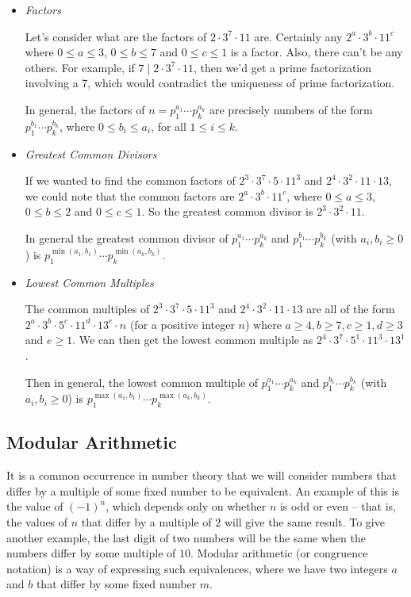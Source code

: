 \documentclass[a4paper]{scrartcl}
\begin{document}
\begin{itemize}
	\item \emph{Factors}
	
	Let's consider what are the factors of $2 \cdot 3^7 \cdot 11$ are. Certainly any $2^a \cdot 3^b \cdot 11^c$ where $0 \leq a \leq 3$, $0 \leq b \leq 7$ and $0 \leq c \leq 1$ is a factor. Also, there can't be any others. For example, if $7 \mid 2 \cdot 3^7 \cdot 11$, then we'd get a prime factorization involving a 7, which would contradict the uniqueness of prime factorization.

	In general, the factors of $n = p_1^{a_1} \cdots p_k^{a_k}$ are precisely numbers of the form $p_1^{b_1} \cdots p_k^{b_k}$, where $0 \leq b_i \leq a_i$, for all $1 \leq i \leq k$.

	\item \emph{Greatest Common Divisors}
	
	If we wanted to find the common factors of $2^3 \cdot 3^7 \cdot 5 \cdot 11^3$ and $2^4 \cdot 3^2 \cdot 11 \cdot 13$, we could note that the common factors are $2^a \cdot 3^b \cdot 11^c$, where $0 \leq a \leq 3$, $0 \leq b \leq 2$ and $0 \leq c \leq 1$.
	So the greatest common divisor is $2^3 \cdot 3^2 \cdot 11$.

	In general the greatest common divisor of $p_1^{a_1} \cdots p_k^{a_k}$ and $p_1^{b_1} \cdots p_k^{b_k}$ (with $a_i, b_i \geq 0$) is $p_1^{\min(a_1, b_1)} \cdots p_k^{\min(a_k, b_k)}$.

	\item \emph{Lowest Common Multiples}
	
	The common multiples of $2^3 \cdot 3^7 \cdot 5 \cdot 11^3$ and $2^4 \cdot 3^2 \cdot 11 \cdot 13$ are all of the form $2^a \cdot 3^b \cdot 5^c \cdot 11^d \cdot 13^e \cdot n$ (for a positive integer $n$) where $a \geq 4, b\geq 7, c\geq 1, d\geq 3$ and $e \geq 1$. We can then get the lowest common multiple as $2^4 \cdot 3^7 \cdot 5^1 \cdot 11^3 \cdot 13^1$.

	Then in general, the lowest common multiple of $p_1^{a_1} \cdots p_k^{a_k}$ and $p_1^{b_1} \cdots p_k^{b_k}$ (with $a_i, b_i \geq 0$) is $p_1^{\max(a_1, b_1)} \cdots p_k^{\max(a_k, b_k)}$.
\end{itemize}



\subsection{Modular Arithmetic}

It is a common occurrence in number theory that we will consider numbers that differ by a multiple of some fixed number to be equivalent. 
An example of this is the value of $(-1)^n$, which depends only on whether $n$ is odd or even -- that is, the values of $n$ that differ by a multiple of $2$ will give the same result. To give another example, the last digit of two numbers will be the same when the numbers differ by some multiple of $10$. Modular arithmetic (or congruence notation) is a way of expressing such equivalences, where we have two integers $a$ and $b$ that differ by some fixed number $m$.
\end{document}
